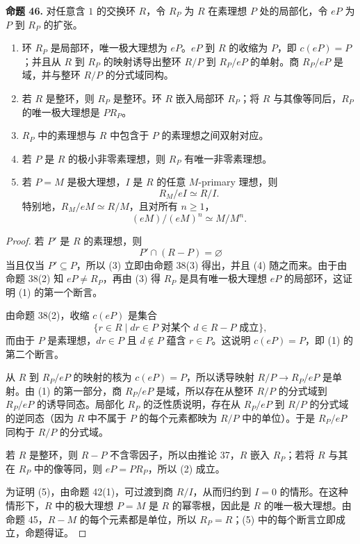 \noindent\textbf{命题 46.} 对任意含 $1$ 的交换环 $R$，令 $R_P$ 为 $R$ 在素理想 $P$ 处的局部化，令 $eP$ 为 $P$ 到 $R_P$ 的扩张。
\begin{enumerate}[label=(\arabic*)]
	\item 环 $R_P$ 是局部环，唯一极大理想为 $eP$。$eP$ 到 $R$ 的收缩为 $P$，即 $c(eP)=P$；并且从 $R$ 到 $R_P$ 的映射诱导出整环 $R/P$ 到 $R_P/eP$ 的单射。商 $R_P/eP$ 是域，并与整环 $R/P$ 的分式域同构。
	\item 若 $R$ 是整环，则 $R_P$ 是整环。环 $R$ 嵌入局部环 $R_P$；将 $R$ 与其像等同后，$R_P$ 的唯一极大理想是 $PR_P$。
	\item $R_P$ 中的素理想与 $R$ 中包含于 $P$ 的素理想之间双射对应。
	\item 若 $P$ 是 $R$ 的极小非零素理想，则 $R_P$ 有唯一非零素理想。
	\item 若 $P=M$ 是极大理想，$I$ 是 $R$ 的任意 $M$-primary 理想，则
	\[
	R_M/eI\simeq R/I.
	\]
	特别地，$R_M/eM\simeq R/M$，且对所有 $n\ge1$，
	\[
	(eM)/(eM)^n\simeq M/M^n.
	\]
\end{enumerate}

\begin{proof}
	若 $P'$ 是 $R$ 的素理想，则
	\[
	P'\cap(R-P)=\varnothing
	\]
	当且仅当 $P'\subseteq P$，所以 (3) 立即由命题 38(3) 得出，并且 (4) 随之而来。由于由命题 38(2) 知 $eP\ne R_P$，再由 (3) 得 $R_P$ 是具有唯一极大理想 $eP$ 的局部环，这证明 (1) 的第一个断言。
	
	由命题 38(2)，收缩 $c(eP)$ 是集合
	\[
	\{r\in R\mid dr\in P\text{ 对某个 }d\in R-P\text{ 成立}\},
	\]
	而由于 $P$ 是素理想，$dr\in P$ 且 $d\notin P$ 蕴含 $r\in P$。这说明 $c(eP)=P$，即 (1) 的第二个断言。
	
	从 $R$ 到 $R_P/eP$ 的映射的核为 $c(eP)=P$，所以诱导映射 $R/P\to R_P/eP$ 是单射。由 (1) 的第一部分，商 $R_P/eP$ 是域，所以存在从整环 $R/P$ 的分式域到 $R_P/eP$ 的诱导同态。局部化 $R_P$ 的泛性质说明，存在从 $R_P/eP$ 到 $R/P$ 的分式域的逆同态（因为 $R$ 中不属于 $P$ 的每个元素都映为 $R/P$ 中的单位）。于是 $R_P/eP$ 同构于 $R/P$ 的分式域。
	
	若 $R$ 是整环，则 $R-P$ 不含零因子，所以由推论 37，$R$ 嵌入 $R_P$；若将 $R$ 与其在 $R_P$ 中的像等同，则 $eP=PR_P$，所以 (2) 成立。
	
	为证明 (5)，由命题 42(1)，可过渡到商 $R/I$，从而归约到 $I=0$ 的情形。在这种情形下，$R$ 中的极大理想 $P=M$ 是 $R$ 的幂零根，因此是 $R$ 的唯一极大理想。由命题 45，$R-M$ 的每个元素都是单位，所以 $R_P=R$；(5) 中的每个断言立即成立，命题得证。
\end{proof}

